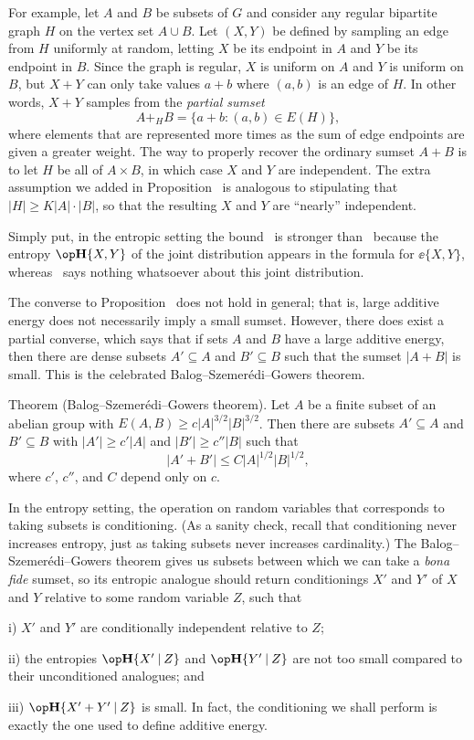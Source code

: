 For example, let $A$ and $B$ be subsets of $G$ and consider any regular bipartite graph $H$ on the
vertex set $A\cup B$. Let $(X,Y)$ be defined by sampling an edge from $H$ uniformly at random, letting
$X$ be its endpoint in $A$ and $Y$ be its endpoint in $B$. Since the graph is regular, $X$ is uniform
on $A$ and $Y$ is uniform on $B$, but $X+Y$ can only take values $a+b$ where $(a,b)$ is an edge of $H$.
In other words, $X+Y$ samples from the {\it partial sumset}
$$ A +_H B = \bigl\{ a + b : (a,b)\in E(H)\bigr\},$$
where elements that are represented more times as the sum of edge endpoints are given a greater weight.
The way to properly recover the ordinary sumset $A+B$ is to let $H$ be all of $A\times B$, in which case
$X$ and $Y$ are independent. The extra assumption we added in Proposition~{\propnaive} is analogous to
stipulating that $|H| \ge K |A|\cdot |B|$, so that the resulting $X$ and $Y$ are ``nearly'' independent.

Simply put, in the entropic setting the bound~ is
stronger than~ because the entropy $\Eta\{X,Y\}$ of the joint distribution appears in
the formula for $\ee\{X,Y\}$, whereas~ says nothing whatsoever about this joint distribution.

The converse to Proposition~{\propinversebalog} does not hold in general; that is, large additive energy
does not necessarily imply a small sumset. However, there does exist a partial converse,
which says that if sets $A$ and $B$ have a large additive energy, then there are dense subsets $A'\subseteq A$
and $B'\subseteq B$ such that the sumset $|A+B|$ is small. This is the celebrated
Balog--Szemer\'edi--Gowers theorem.

\parenproclaim Theorem {\advthm} (Balog--Szemer\'edi--Gowers theorem). Let $A$ be a finite
subset of an abelian group with $E(A,B) \ge c |A|^{3/2} |B|^{3/2}$. Then there are subsets
$A'\subseteq A$ and $B'\subseteq B$ with $|A'| \ge c' |A|$ and $|B'|\ge c''|B|$ such that
$$|A'+B'| \le C |A|^{1/2}|B|^{1/2},$$
where $c'$, $c''$, and $C$ depend only on $c$.

In the entropy setting, the operation on random variables that corresponds to taking subsets is
conditioning. (As a sanity check, recall that conditioning never increases entropy, just
as taking subsets never increases cardinality.) The Balog--Szemer\'edi--Gowers theorem gives
us subsets between which we can take a {\it bona fide} sumset, so its entropic analogue
should return conditionings $X'$ and $Y'$ of $X$ and $Y$ relative to some random variable $Z$,
such that
\medskip
\item{i)} $X'$ and $Y'$ are conditionally independent relative to $Z$;
\smallskip
\item{ii)} the entropies $\Eta\{X'\given Z\}$ and
$\Eta\{Y'\given Z\}$ are not too small compared to their unconditioned analogues; and
\smallskip
\item{iii)} $\Eta\{X'+Y'\given Z\}$ is small.
\medskip
In fact, the conditioning we shall perform is exactly the one used to define additive energy.

